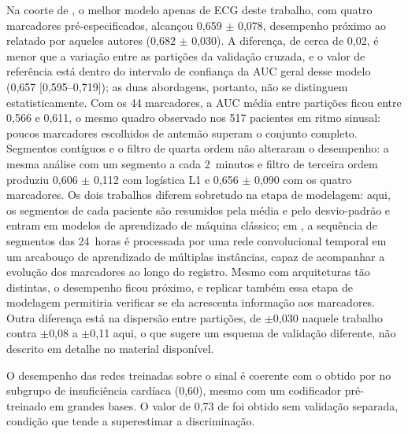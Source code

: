 Na coorte de , o melhor modelo apenas de
\gls{ECG} deste trabalho, com quatro marcadores pré-especificados, alcançou
0,659 $\pm$ 0,078, desempenho próximo ao relatado por aqueles autores
(0,682 $\pm$ 0,030). A diferença, de cerca de 0,02, é menor que a variação
entre as partições da validação cruzada, e o valor de referência está
dentro do intervalo de confiança da \gls{AUC} geral desse modelo
(0,657 [0,595--0,719]); as duas abordagens, portanto, não se distinguem
estatisticamente. Com os 44 marcadores, a \gls{AUC} média entre partições
ficou entre 0,566 e 0,611, o mesmo quadro observado nos 517 pacientes em
ritmo sinusal: poucos marcadores escolhidos de antemão superam o conjunto
completo.
Segmentos contíguos e o filtro de quarta ordem não alteraram o desempenho:
a mesma análise com um segmento a cada 2~minutos e filtro de terceira ordem
produziu 0,606 $\pm$ 0,112 com logística L1 e 0,656 $\pm$ 0,090 com os
quatro marcadores. Os dois trabalhos diferem sobretudo na etapa de
modelagem: aqui, os segmentos de cada paciente são resumidos pela média e
pelo desvio-padrão e entram em modelos de aprendizado de máquina clássico;
em , a sequência de segmentos das 24~horas é
processada por uma rede convolucional temporal em um arcabouço de
aprendizado de múltiplas instâncias, capaz de acompanhar a evolução dos
marcadores ao longo do registro. Mesmo com arquiteturas tão distintas, o
desempenho ficou próximo, e replicar também essa etapa de modelagem
permitiria verificar se ela acrescenta informação aos marcadores. Outra
diferença está na dispersão entre
partições, de $\pm$0,030 naquele trabalho contra $\pm$0,08 a $\pm$0,11
aqui, o que sugere um esquema de validação diferente, não descrito em
detalhe no material disponível.

O desempenho das redes
treinadas sobre o sinal é coerente com o obtido por 
no subgrupo de insuficiência cardíaca (0,60), mesmo com um codificador
pré-treinado em grandes bases. O valor de 0,73 de
 foi obtido sem validação separada, condição
que tende a superestimar a discriminação.

